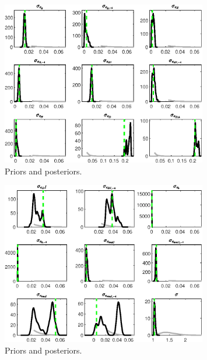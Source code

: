  
\begin{figure}[H]
\centering
\includegraphics[width=0.80\textwidth]{BRS_sectoral_wo_vcu/Output/BRS_sectoral_wo_vcu_PriorsAndPosteriors1}
\caption{Priors and posteriors.}\label{Fig:PriorsAndPosteriors:1}
\end{figure}
 
\begin{figure}[H]
\centering
\includegraphics[width=0.80\textwidth]{BRS_sectoral_wo_vcu/Output/BRS_sectoral_wo_vcu_PriorsAndPosteriors2}
\caption{Priors and posteriors.}\label{Fig:PriorsAndPosteriors:2}
\end{figure}
 
